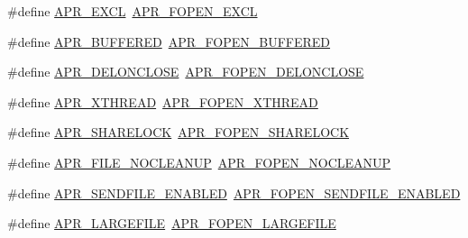 \begin{DoxyCompactItemize}
\item 
\#define \hyperlink{group__apr__file__open__flags_ga209c26b2b903cc23417f6781d4edf891}{A\+P\+R\+\_\+\+E\+X\+CL}~\hyperlink{group__apr__file__open__flags_gabb7fb062cdf1d58faee8c7ea518496f1}{A\+P\+R\+\_\+\+F\+O\+P\+E\+N\+\_\+\+E\+X\+CL}
\item 
\#define \hyperlink{group__apr__file__open__flags_ga6edc818199e8b90e3dabf97c42a27158}{A\+P\+R\+\_\+\+B\+U\+F\+F\+E\+R\+ED}~\hyperlink{group__apr__file__open__flags_gac48fd4c853c9f561632a2e8aaf5d8d97}{A\+P\+R\+\_\+\+F\+O\+P\+E\+N\+\_\+\+B\+U\+F\+F\+E\+R\+ED}
\item 
\#define \hyperlink{group__apr__file__open__flags_gaebc7f034a72dffe64858b1b9451994ff}{A\+P\+R\+\_\+\+D\+E\+L\+O\+N\+C\+L\+O\+SE}~\hyperlink{group__apr__file__open__flags_ga5d3756f6d242c667ed1d3f54af4916eb}{A\+P\+R\+\_\+\+F\+O\+P\+E\+N\+\_\+\+D\+E\+L\+O\+N\+C\+L\+O\+SE}
\item 
\#define \hyperlink{group__apr__file__open__flags_gaa9120c0e395d8a0e640b5eafa8f11cce}{A\+P\+R\+\_\+\+X\+T\+H\+R\+E\+AD}~\hyperlink{group__apr__file__open__flags_ga435cd9b2604b11796779c23ffa00a3dd}{A\+P\+R\+\_\+\+F\+O\+P\+E\+N\+\_\+\+X\+T\+H\+R\+E\+AD}
\item 
\#define \hyperlink{group__apr__file__open__flags_ga41277154f4f754a22287ed90e9466811}{A\+P\+R\+\_\+\+S\+H\+A\+R\+E\+L\+O\+CK}~\hyperlink{group__apr__file__open__flags_ga426f6e2a8457ab410d99248269059a18}{A\+P\+R\+\_\+\+F\+O\+P\+E\+N\+\_\+\+S\+H\+A\+R\+E\+L\+O\+CK}
\item 
\#define \hyperlink{group__apr__file__open__flags_ga3ef1061dbb3adf595701bd12edb062f9}{A\+P\+R\+\_\+\+F\+I\+L\+E\+\_\+\+N\+O\+C\+L\+E\+A\+N\+UP}~\hyperlink{group__apr__file__open__flags_ga3fc9b5a7791d9f462997cd29de67eb80}{A\+P\+R\+\_\+\+F\+O\+P\+E\+N\+\_\+\+N\+O\+C\+L\+E\+A\+N\+UP}
\item 
\#define \hyperlink{group__apr__file__open__flags_ga17e216aadb23254580258889e10c53f3}{A\+P\+R\+\_\+\+S\+E\+N\+D\+F\+I\+L\+E\+\_\+\+E\+N\+A\+B\+L\+ED}~\hyperlink{group__apr__file__open__flags_ga60c21e28e4a612d58a874fe2cc71a6e4}{A\+P\+R\+\_\+\+F\+O\+P\+E\+N\+\_\+\+S\+E\+N\+D\+F\+I\+L\+E\+\_\+\+E\+N\+A\+B\+L\+ED}
\item 
\#define \hyperlink{group__apr__file__open__flags_gaafa04fd4ec71910a5d7af1c7f5596bad}{A\+P\+R\+\_\+\+L\+A\+R\+G\+E\+F\+I\+LE}~\hyperlink{group__apr__file__open__flags_gaf6cfaa4789e6264afd186235f0adbc22}{A\+P\+R\+\_\+\+F\+O\+P\+E\+N\+\_\+\+L\+A\+R\+G\+E\+F\+I\+LE}
\end{DoxyCompactItemize}


